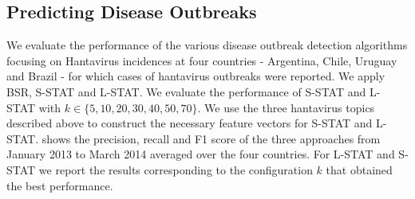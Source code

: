 \documentclass[conference]{IEEEtran}
\newcommand{\fullmodel}{{S-STAT}\xspace}
\newcommand{\locationmodel}{{L-STAT}\xspace}
\begin{document}
\subsection{Predicting Disease Outbreaks}
We evaluate the performance of the various disease outbreak detection algorithms focusing on Hantavirus incidences at four countries - Argentina, Chile, Uruguay and Brazil - for which cases of hantavirus outbreaks were reported. We apply BSR,  \fullmodel and \locationmodel. We evaluate the performance of \fullmodel and \locationmodel with $k \in \{5,10,20,30,40,50,70\}$. We use the three hantavirus topics described above to construct the necessary feature vectors for \fullmodel and \locationmodel.   shows the precision, recall and F1 score  of the three approaches from January 2013 to March 2014 averaged over the four countries. For \locationmodel and \fullmodel we report the results corresponding to the configuration $k$ that obtained the best performance. 
\end{document}
